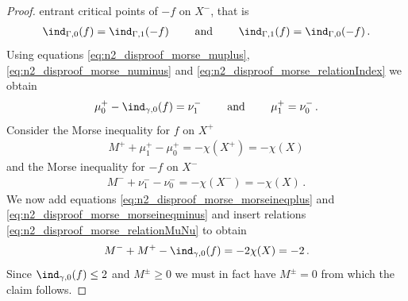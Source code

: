 \begin{proof}
  entrant critical points of $-f$ on $X^-$, that is
  \begin{align}
    \ind_{\Gamma,0}(f)=\ind_{\Gamma,1}(-f)\qquad\text{ and }\qquad 
    \ind_{\Gamma,1}(f)=\ind_{\Gamma,0}(-f)\,.\label{eq:n2_disproof_morse_relationIndex} 
  \end{align}
  Using equations \eqref{eq:n2_disproof_morse_muplus}, \eqref{eq:n2_disproof_morse_numinus} and \eqref{eq:n2_disproof_morse_relationIndex}
  we obtain
  \begin{align}
    \mu^+_0-\ind_{\gamma,0}(f)=\nu^-_1 \qquad\text{ and }\qquad \mu^+_1=\nu^-_0\,.\label{eq:n2_disproof_morse_relationMuNu}
  \end{align}
  Consider the Morse inequality for $f$ on $X^+$
  \begin{align}
    M^++\mu^+_1-\mu^+_0=-\chi(X^+)=-\chi(X)\label{eq:n2_disproof_morse_morseineqplus}
  \end{align}
  and the Morse inequality for $-f$ on $X^-$
  \begin{align}
    M^-+\nu^-_1-\nu^-_0=-\chi(X^-)=-\chi(X)\,.\label{eq:n2_disproof_morse_morseineqminus}
  \end{align}
  We now add equations \eqref{eq:n2_disproof_morse_morseineqplus} and \eqref{eq:n2_disproof_morse_morseineqminus}
  and insert relations \eqref{eq:n2_disproof_morse_relationMuNu} to obtain
  \begin{align*}
    M^-+M^+-\ind_{\gamma,0}(f)=-2\chi(X)=-2\,.
  \end{align*}
  Since $\ind_{\gamma,0}(f)\leq2$ and $M^\pm\geq0$ we must in fact have $M^\pm=0$ from which the claim follows.


  

\end{proof}
